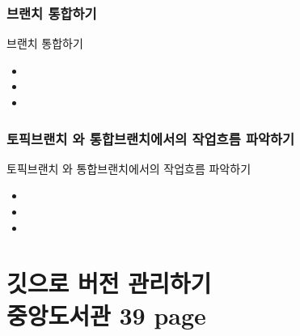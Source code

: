 \documentclass[aspectratio=1610,20pt,xcolor=pdftex,dvipsnames,table,handout]{beamer}
\begin{document}
		\section{브랜치 통합하기}
		\begin{frame} [t,plain]
			\begin{block} {브랜치 통합하기}
			\setlength{\leftmargini}{2em}			
			\begin{itemize}
				\item 
				\item 
				\item 
			\end{itemize}
			\end{block}						
		\end{frame}						

		\section{토픽브랜치 와 통합브랜치에서의 작업흐름 파악하기}
		\begin{frame} [t,plain]
			\begin{block} {토픽브랜치 와 통합브랜치에서의 작업흐름 파악하기}
			\setlength{\leftmargini}{2em}			
			\begin{itemize}
				\item 
				\item 
				\item 
			\end{itemize}
			\end{block}						
		\end{frame}						

		\begin{frame} [t,plain]
		\end{frame}						


		\part{깃으로 버전 관리하기 \\중앙도서관 39 page }
		\frame{\partpage}


\label{part1} 	%
\end{document}
